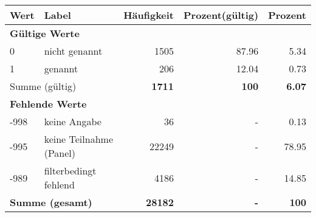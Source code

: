      \begin{longtable}{lXrrr}
     \toprule
     \textbf{Wert} & \textbf{Label} & \textbf{Häufigkeit} & \textbf{Prozent(gültig)} & \textbf{Prozent} \\
     \endhead
     \midrule
     \multicolumn{5}{l}{\textbf{Gültige Werte}}\\

     0 &
     \multicolumn{1}{X}{ nicht genannt   } &


       \num{1505} &
       \num[round-mode=places,round-precision=2]{87,96} &
         \num[round-mode=places,round-precision=2]{5,34} \\

     1 &
     \multicolumn{1}{X}{ genannt   } &


       \num{206} &
       \num[round-mode=places,round-precision=2]{12,04} &
         \num[round-mode=places,round-precision=2]{0,73} \\
     \midrule
     \multicolumn{2}{l}{Summe (gültig)} &
       \textbf{\num{1711}} &
     \textbf{100} &
       \textbf{\num[round-mode=places,round-precision=2]{6,07}} \\
     \multicolumn{5}{l}{\textbf{Fehlende Werte}}\\
       -998 &
       keine Angabe &
         \num{36} &
        - &
         \num[round-mode=places,round-precision=2]{0,13} \\
       -995 &
       keine Teilnahme (Panel) &
         \num{22249} &
        - &
         \num[round-mode=places,round-precision=2]{78,95} \\
       -989 &
       filterbedingt fehlend &
         \num{4186} &
        - &
         \num[round-mode=places,round-precision=2]{14,85} \\
     \midrule
     \multicolumn{2}{l}{\textbf{Summe (gesamt)}} &
          \textbf{\num{28182}} &
        \textbf{-} &
        \textbf{100} \\
     \bottomrule
     \end{longtable}
     
